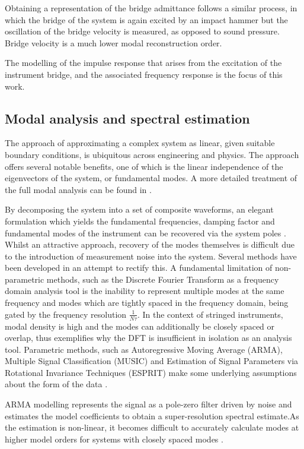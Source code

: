 Obtaining a representation of the bridge admittance follows a similar process, in which the bridge of the system is again excited by an impact hammer but the oscillation of the bridge velocity is measured, as opposed to sound pressure. Bridge velocity is a much lower modal reconstruction order.

The modelling of the impulse response that arises from the excitation of the instrument bridge, and the associated frequency response is the focus of this work.

\subsection{Modal analysis and spectral estimation}
\label{modal-analysis}
The approach of approximating a complex system as linear, given suitable boundary conditions, is ubiquitous across engineering and physics. The approach offers several notable benefits, one of which is the linear independence of the eigenvectors of the system, or fundamental modes. A more detailed treatment of the full modal analysis can be found in \cite{modal-analysis-violin}.

By decomposing the system into a set of composite waveforms, an elegant formulation which yields the fundamental frequencies, damping factor and fundamental modes of the instrument can be recovered via the system poles \cite{juang-1994-book}. Whilst an attractive approach, recovery of the modes themselves is difficult due to the introduction of measurement noise into the system. Several methods have been developed in an attempt to rectify this.
A fundamental limitation of non-parametric methods, such as the Discrete Fourier Transform as a frequency domain analysis tool is the inability to represent multiple modes at the same frequency and modes which are tightly spaced in the frequency domain, being gated by the frequency resolution $\frac{1}{N\tau}$. In the context of stringed instruments, modal density is high and the modes can additionally be closely spaced or overlap, thus exemplifies why the DFT is insufficient in isolation as an analysis tool. Parametric methods, such as Autoregressive Moving Average (ARMA), Multiple Signal Classification (MUSIC) and Estimation of Signal Parameters via Rotational Invariance Techniques (ESPRIT) make some underlying assumptions about the form of the data \cite{music, esprit}.

ARMA modelling represents the signal as a pole-zero filter driven by noise and estimates the model coefficients to obtain a super-resolution spectral estimate.As the estimation is non-linear, it becomes difficult to accurately calculate modes at higher model orders for systems with closely spaced modes \cite{hayes}.


